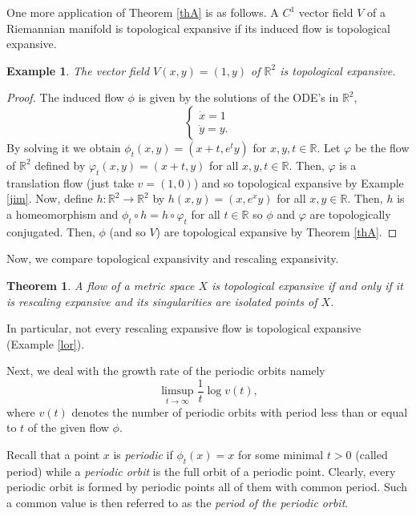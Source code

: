 \documentclass[11pt,letterpaper]{amsart}
\newtheorem{thm}{Theorem}%
\newtheorem{ex}{Example}[section]
\begin{document}
One more application of Theorem \ref{thA} is as follows.
A $C^1$ vector field $V$ of a Riemannian manifold is topological expansive if its induced flow is topological expansive.

\begin{ex}
\label{colina}
The vector field $V(x,y)=(1, y)$ of $\mathbb{R}^2$ is topological expansive.
\end{ex}

\begin{proof}
The induced flow $\phi$ is given by the solutions of the ODE's in $\mathbb{R}^2$,
$$
\left\{
\begin{array}{rcl}
\dot{x}=1\\
\dot{y}=y.
\end{array}
\right.
$$
By solving it we obtain $\phi_t(x,y)=(x+t,e^ty)$ for $x,y,t\in \mathbb{R}$.
Let $\varphi$ be the flow of $\mathbb{R}^2$ defined by
$\varphi_t(x,y)=(x+t,y)$ for all $x,y,t\in\mathbb{R}$. Then, $\varphi$ is a translation flow
(just take $v=(1,0)$) and so topological expansive by Example \ref{jim}.
Now, define $h:\mathbb{R}^2\to\mathbb{R}^2$ by $h(x,y)=(x,e^xy)$ for all $x,y\in \mathbb{R}$. Then, $h$ is a homeomorphism and  $\phi_t\circ h=h\circ \varphi_t$ for all $t\in\mathbb{R}$ so $\phi$ and $\varphi$ are topologically conjugated.
Then, $\phi$ (and so $V$) are topological expansive by Theorem \ref{thA}.
\end{proof}

Now, we compare topological expansivity and rescaling expansivity.

\begin{thm}
\label{don}
A flow of a metric space $X$ is topological expansive if and only if it is rescaling expansive and its singularities are isolated points of $X$.
\end{thm}

In particular, not every rescaling expansive flow is topological expansive (Example \ref{lor}).

Next, we deal with the growth rate of the periodic orbits namely
$$
\limsup_{t\to\infty}\frac{1}t\log v(t),
$$
where $v(t)$ denotes the number of periodic orbits with period less than or equal to $t$ of the given flow $\phi$.

Recall that a point $x$ is {\em periodic} if $\phi_t(x) = x$ for some minimal $t > 0$ (called period) while a {\em periodic orbit} is the full orbit of a periodic point. Clearly, every periodic orbit is formed by periodic points all of them with common period. Such a common value is then referred to as the {\em period of the periodic orbit}.
\end{document}
